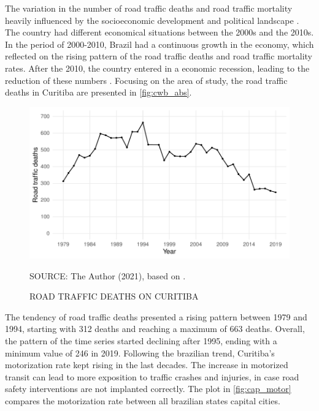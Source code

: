 

The variation in the number of road traffic deaths and road traffic mortality heavily influenced by the socioeconomic development and political landscape \cite{Ferraz2012}. The country had different economical situations between the 2000s and the 2010s. In the period of 2000-2010, Brazil had a continuous growth in the economy, which reflected on the rising pattern of the road traffic deaths and road traffic mortality rates. After the 2010, the country entered in a economic recession, leading to the reduction of these numbers \cite{Bastos2020}. Focusing on the area of study, the road traffic deaths in Curitiba are presented in \autoref{fig:cwb_abs}.   



\begin{figure}[!htbp]
    \centering\footnotesize
    \captionsetup{font=footnotesize}
    \caption{ROAD TRAFFIC DEATHS ON CURITIBA}
    \includegraphics{fig/cwb_abs.pdf}
    \label{fig:cwb_abs}
    \par SOURCE: The Author (2021), based on \textcite{MinistryofHealth2020}.
\end{figure}  

The tendency of road traffic deaths presented a rising pattern between 1979 and 1994, starting with 312 deaths and reaching a maximum of 663 deaths. Overall, the pattern of the time series started declining after 1995, ending with a minimum value of 246 in 2019. Following the brazilian trend, Curitiba's motorization rate kept rising in the last decades. The increase in motorized transit can lead to more exposition to traffic crashes and injuries, in case road safety interventions are not implanted correctly. The plot in \autoref{fig:cap_motor} compares the motorization rate between all brazilian states capital cities.    

